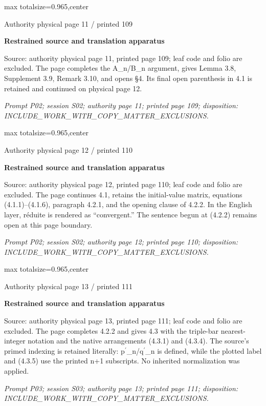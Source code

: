 \documentclass{article}
\begin{document}
\newpage
\noindent\begin{adjustbox}{max totalsize={\textwidth}{0.965\textheight},center}\begin{minipage}{\textwidth}
\noindent\hfill\scriptsize Authority physical page 11 / printed 109\par\normalsize
\textbf{Restrained source and translation apparatus}\par
Source: authority physical page 11, printed page 109; leaf code and folio are excluded. The page completes the A\_n/B\_n argument, gives Lemma 3.8, Supplement 3.9, Remark 3.10, and opens §4. Its final open parenthesis in 4.1 is retained and continued on physical page 12.
\par\smallskip
\textit{Prompt P02; session S02; authority page 11; printed page 109; disposition: INCLUDE\_WORK\_WITH\_COPY\_MATTER\_EXCLUSIONS.}
\end{minipage}\end{adjustbox}

\newpage
\noindent\begin{adjustbox}{max totalsize={\textwidth}{0.965\textheight},center}\begin{minipage}{\textwidth}
\noindent\hfill\scriptsize Authority physical page 12 / printed 110\par\normalsize
\textbf{Restrained source and translation apparatus}\par
Source: authority physical page 12, printed page 110; leaf code and folio are excluded. The page continues 4.1, retains the initial-value matrix, equations (4.1.1)–(4.1.6), paragraph 4.2.1, and the opening clause of 4.2.2. In the English layer, réduite is rendered as “convergent.” The sentence begun at (4.2.2) remains open at this page boundary.
\par\smallskip
\textit{Prompt P02; session S02; authority page 12; printed page 110; disposition: INCLUDE\_WORK\_WITH\_COPY\_MATTER\_EXCLUSIONS.}
\end{minipage}\end{adjustbox}

\newpage
\noindent\begin{adjustbox}{max totalsize={\textwidth}{0.965\textheight},center}\begin{minipage}{\textwidth}
\noindent\hfill\scriptsize Authority physical page 13 / printed 111\par\normalsize
\textbf{Restrained source and translation apparatus}\par
Source: authority physical page 13, printed page 111; leaf code and folio are excluded. The page completes 4.2.2 and gives 4.3 with the triple-bar nearest-integer notation and the native arrangements (4.3.1) and (4.3.4). The source’s primed indexing is retained literally: p\ensuremath{{}^{\prime}}\_n/q\ensuremath{{}^{\prime}}\_n is defined, while the plotted label and (4.3.5) use the printed n+1 subscripts. No inherited normalization was applied.
\par\smallskip
\textit{Prompt P03; session S03; authority page 13; printed page 111; disposition: INCLUDE\_WORK\_WITH\_COPY\_MATTER\_EXCLUSIONS.}
\end{minipage}\end{adjustbox}
\end{document}
